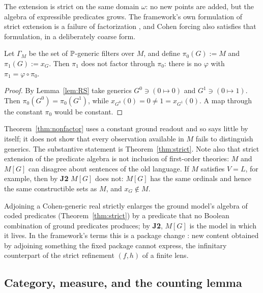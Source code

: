 The extension is strict on the same domain $\omega$: no new points are added, but the algebra of
expressible predicates grows. The framework's own formulation of strict extension is a failure of
factorization \citep{SBTCantorShell}, and Cohen forcing also satisfies that formulation, in a
deliberately coarse form.

\begin{theorem}\label{thm:nonfactor}
Let $\Gamma_M$ be the set of $\mathbb{P}$-generic filters over $M$, and define $\pi_0(G):=M$ and
$\pi_1(G):=x_G$. Then $\pi_1$ does not factor through $\pi_0$: there is no $\varphi$ with
$\pi_1=\varphi\circ\pi_0$.
\end{theorem}

\begin{proof}
By Lemma~\ref{lem:RS} take generics $G^0\ni(0\mapsto0)$ and $G^1\ni(0\mapsto1)$. Then
$\pi_0(G^0)=\pi_0(G^1)$, while $x_{G^0}(0)=0\ne1=x_{G^1}(0)$. A map through the constant $\pi_0$
would be constant.
\end{proof}

Theorem~\ref{thm:nonfactor} uses a constant ground readout and so says little by itself; it does not
show that every observation available in $M$ fails to distinguish generics. The substantive
statement is Theorem~\ref{thm:strict}. Note also that strict extension of the predicate algebra is
not inclusion of first-order theories: $M$ and $M[G]$ can disagree about sentences of the old
language. If $M$ satisfies $V=L$, for example, then by \textbf{J2} $M[G]$ does not: $M[G]$ has the
same ordinals and hence the same constructible sets as $M$, and $x_G\notin M$.

\begin{corollary}\label{cor:strictcohen}
Adjoining a Cohen-generic real strictly enlarges the ground model's algebra of coded predicates
(Theorem~\ref{thm:strict}) by a predicate that no Boolean combination of ground predicates
produces; by \textbf{J2}, $M[G]$ is the model in which it lives. In the framework's terms this is a
package change \citep{SBTIncompleteness,SBTCantorShell}: new content obtained by adjoining
something the fixed package cannot express, the infinitary counterpart of the strict refinement
$(f,h)$ of a finite lens.
\end{corollary}

\subsection{Category, measure, and the counting lemma}\label{ssec:category}

